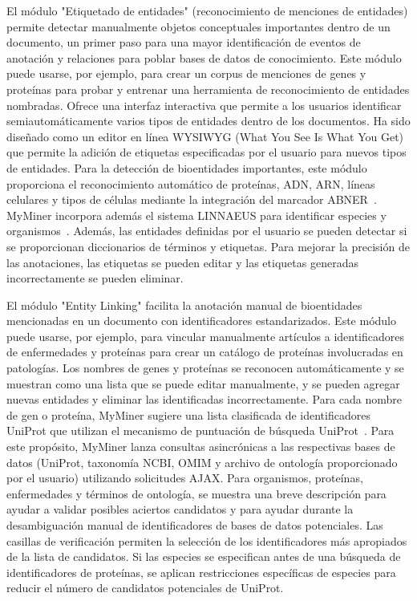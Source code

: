 El módulo "Etiquetado de entidades" (reconocimiento de menciones de entidades) permite detectar manualmente objetos conceptuales importantes dentro de un documento, un primer paso para una mayor identificación de eventos de anotación y relaciones para poblar bases de datos de conocimiento.
Este módulo puede usarse, por ejemplo, para crear un corpus de menciones de genes y proteínas para probar y entrenar una herramienta de reconocimiento de entidades nombradas.
Ofrece una interfaz interactiva que permite a los usuarios identificar semiautomáticamente varios tipos de entidades dentro de los documentos.
Ha sido diseñado como un editor en línea WYSIWYG (What You See Is What You Get) que permite la adición de etiquetas especificadas por el usuario para nuevos tipos de entidades.
Para la detección de bioentidades importantes, este módulo proporciona el reconocimiento automático de proteínas, ADN, ARN, líneas celulares y tipos de células mediante la integración del marcador ABNER~\cite{Settles2005}.
MyMiner incorpora además el sistema LINNAEUS para identificar especies y organismos~\cite{Gerner2010}.
Además, las entidades definidas por el usuario se pueden detectar si se proporcionan diccionarios de términos y etiquetas.
Para mejorar la precisión de las anotaciones, las etiquetas se pueden editar y las etiquetas generadas incorrectamente se pueden eliminar.

El módulo "Entity Linking" facilita la anotación manual de bioentidades mencionadas en un documento con identificadores estandarizados.
Este módulo puede usarse, por ejemplo, para vincular manualmente artículos a identificadores de enfermedades y proteínas para crear un catálogo de proteínas involucradas en patologías.
Los nombres de genes y proteínas se reconocen automáticamente y se muestran como una lista que se puede editar manualmente, y se pueden agregar nuevas entidades y eliminar las identificadas incorrectamente.
Para cada nombre de gen o proteína, MyMiner sugiere una lista clasificada de identificadores UniProt que utilizan el mecanismo de puntuación de búsqueda UniProt~\cite{Arighi2011}.
Para este propósito, MyMiner lanza consultas asincrónicas a las respectivas bases de datos (UniProt, taxonomía NCBI, OMIM y archivo de ontología proporcionado por el usuario) utilizando solicitudes AJAX.
Para organismos, proteínas, enfermedades y términos de ontología, se muestra una breve descripción para ayudar a validar posibles aciertos candidatos y para ayudar durante la desambiguación manual de identificadores de bases de datos potenciales.
Las casillas de verificación permiten la selección de los identificadores más apropiados de la lista de candidatos.
Si las especies se especifican antes de una búsqueda de identificadores de proteínas, se aplican restricciones específicas de especies para reducir el número de candidatos potenciales de UniProt.

